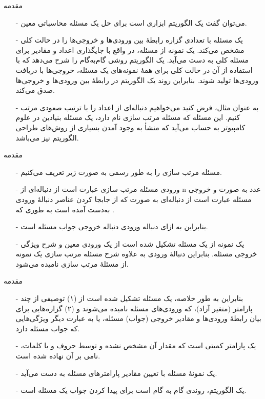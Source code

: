\begin{frame}{مقدمه}
\begin{itemize}\itemr
\item[-]
می‌توان گفت یک الگوریتم ابزاری است برای حل یک مسئله محاسباتی معین.
\item[-]
یک مسئله با تعدادی گزاره رابطهٔ بین ورودی‌ها و خروجی‌ها را در حالت کلی مشخص می‌کند. یک نمونه از مسئله، در واقع با جایگذاری اعداد و مقادیر برای مسئله کلی به دست می‌آید. یک الگوریتم روشی گام‌به‌گام را شرح می‌دهد که با استفاده از آن در حالت کلی برای همهٔ نمونه‌های یک مسئله، خروجی‌ها با دریافت ورودی‌ها تولید شوند.
بنابراین روند یک الگوریتم در رابطهٔ بین ورودی‌ها و خروجی‌ها صدق می‌کند.
\item[-]
به عنوان مثال، فرض کنید می‌خواهیم دنباله‌ای از اعداد را با ترتیب صعودی مرتب کنیم. این مسئله که مسئله مرتب سازی
نام دارد، یک مسئله بنیادین در علوم کامپیوتر به حساب می‌آید که منشأ به وجود آمدن بسیاری از روش‌های طراحی الگوریتم نیز می‌باشد.
\end{itemize}
\end{frame}


\begin{frame}{مقدمه}
\begin{itemize}\itemr
\item[-]
مسئله مرتب سازی را به طور رسمی به صورت زیر تعریف می‌کنیم.
\item[-]
ورودی مسئله مرتب سازی عبارت است از دنباله‌ای از n عدد به صورت
و خروجی مسئله عبارت است از دنباله‌ای به صورت
که از جابجا کردن عناصر دنبالهٔ ورودی به‌دست آمده است به طوری که
.
\item[-]
بنابراین به ازای دنباله ورودی
دنباله خروجی
جواب مسئله است.
\item[-]
یک نمونه از یک مسئله
تشکیل شده است از یک ورودی معین و شرح ویژگی خروجی مسئله. بنابراین 
 دنبالهٔ ورودی
  به علاوه شرح مسئله مرتب سازی یک نمونه از مسئلهٔ مرتب سازی نامیده می‌شود.
\end{itemize}
\end{frame}

\begin{frame}{مقدمه}
\begin{itemize}\itmsep{5mm}
\item[-]
بنابراین به طور خلاصه،
یک مسئله تشکیل شده است از (۱) توصیفی از چند پارامتر (متغیر آزاد)، که ورودی‌های مسئله نامیده می‌شوند و (۲) گزاره‌هایی برای بیان رابطهٔ ورودی‌ها و مقادیر خروجی‌ (جواب) مسئله، یا به عبارت دیگر
ویژگی‌هایی که جواب مسئله دارد.
\item[-]
یک پارامتر کمیتی است که مقدار آن مشخص نشده و توسط حروف و یا کلمات، نامی بر آن نهاده شده است.
\item[-]
یک نمونهٔ مسئله با تعیین مقادیر پارامترهای مسئله به دست می‌آید.
\item[-]
یک الگوریتم، روندی گام به گام است برای پیدا کردن جواب یک مسئله است.
\end{itemize}
\end{frame}

